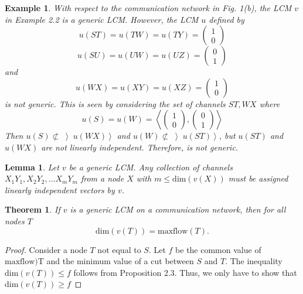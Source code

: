 \documentclass{IEEEtran}
\newtheorem{theo}{Theorem}
\newtheorem{exam}{Example}
\newtheorem{proof}{\hskip 2em Proof}
\newtheorem{lemm}{Lemma}
\begin{document}
\begin{exam}
	With respect to the communication network in Fig. 1(b), the LCM $v$ in Example 2.2 is a generic LCM. However, the LCM $u$ defined by
	$$ u(ST)=u(TW)=u(TY)=\begin{pmatrix} 1 \\ 0 \end{pmatrix}$$
	$$ u(SU)=u(UW)=u(UZ)=\begin{pmatrix} 0 \\ 1 \end{pmatrix}$$
	and
	$$ u(WX)=u(XY)=u(XZ)=\begin{pmatrix} 1 \\ 0 \end{pmatrix}$$
	is not generic. This is seen by considering the set of channels ${ST,WX}$ where
	$$u(S)=u(W)=\left \langle \begin{pmatrix} 1 \\ 0 \end{pmatrix}, \begin{pmatrix} 0 \\ 1 \end{pmatrix} \right \rangle$$
	Then $u(S)\nsubset \left \rangle u(WX) \right \rangle$ and $u(W)\nsubset \left \rangle u(ST) \right \rangle$, but $u(ST)$ and $u(WX)$ are not linearly independent. Therefore, is not generic.
\end{exam}
\begin{lemm}
	Let $v$ be a generic LCM. Any collection of channels $X_1Y_1, X_2Y_2, \dots X_mY_m$ from a node $X$ with $m \leq \text{dim}(v(X))$ must be assigned linearly independent vectors by $v$.
\end{lemm}
\begin{theo}
	If $v$ is a generic LCM on a communication network, then for all nodes $T$
	$$\text{dim}(v(T))=\text{maxflow}(T).$$
\end{theo}
\begin{proof}
	Consider a node $T$ not equal to $S$. Let $f$ be the common value of $\text{maxflow){T}}$ and the minimum value of a cut between $S$ and $T$. The inequality $\text{dim}(v(T))\leq f$ follows from Proposition 2.3. Thus, we only have to show that $\text{dim}(v(T))\geq f$
\end{proof}
\end{document}
